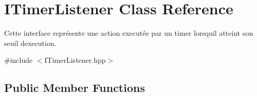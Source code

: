 \hypertarget{classITimerListener}{}\section{I\+Timer\+Listener Class Reference}
\label{classITimerListener}


Cette interface représente une action executée par un timer lorsqu\textquotesingle{}il atteint son seuil d\textquotesingle{}execution.  




{\ttfamily \#include $<$I\+Timer\+Listener.\+hpp$>$}

\subsection*{Public Member Functions}
